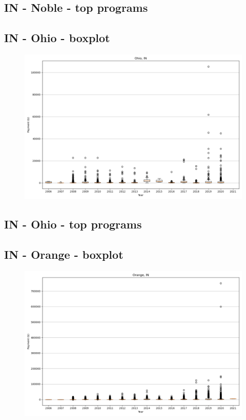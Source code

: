 \subsection*{IN - Noble - top programs}

\newpage
\subsection*{IN - Ohio - boxplot}
\begin{figure}[h]
\centering
\includegraphics[width=7in]{../output/boxplots/counties/Ohio-IN_boxplot.png}
\end{figure}


\subsection*{IN - Ohio - top programs}

\newpage
\subsection*{IN - Orange - boxplot}
\begin{figure}[h]
\centering
\includegraphics[width=7in]{../output/boxplots/counties/Orange-IN_boxplot.png}
\end{figure}


